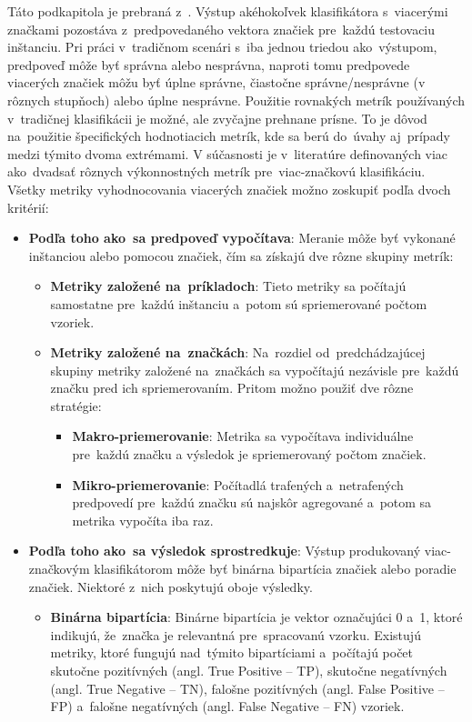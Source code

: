 Táto podkapitola je prebraná z~\cite{Herrera:2016}. Výstup akéhokoľvek klasifikátora s~viacerými značkami pozostáva z~predpovedaného vektora značiek pre~každú testovaciu inštanciu. Pri práci v~tradičnom scenári s~iba jednou triedou ako~výstupom,  predpoveď môže byť správna alebo nesprávna, naproti tomu predpovede viacerých značiek môžu byť úplne správne, čiastočne správne/nesprávne (v rôznych stupňoch) alebo úplne nesprávne.
Použitie rovnakých metrík používaných v~tradičnej klasifikácii je možné, ale zvyčajne prehnane prísne. To je dôvod na~použitie špecifických hodnotiacich metrík, kde sa berú do~úvahy aj~prípady medzi týmito dvoma extrémami.
V súčasnosti je v~literatúre definovaných viac ako~dvadsať rôznych výkonnostných metrík pre~viac-značkovú klasifikáciu. Všetky metriky vyhodnocovania viacerých značiek možno zoskupiť podľa dvoch kritérií:
\begin{itemize}
\item \textbf{Podľa toho ako~sa  predpoveď vypočítava}: Meranie môže byť vykonané inštanciou alebo pomocou
značiek, čím sa získajú dve rôzne skupiny metrík:
    \begin{itemize}
    \item \textbf{Metriky založené na~príkladoch}: Tieto metriky sa počítajú samostatne pre~každú inštanciu a~potom sú  spriemerované počtom vzoriek.
    \item \textbf{Metriky založené na~značkách}: Na~rozdiel od~predchádzajúcej skupiny metriky založené na~značkách sa vypočítajú nezávisle pre~každú značku pred ich spriemerovaním. Pritom možno použiť dve rôzne stratégie:
        \begin{itemize}
        \item \textbf{Makro-priemerovanie}: Metrika sa vypočítava individuálne pre~každú značku a
        výsledok je spriemerovaný počtom značiek.
        \item \textbf{Mikro-priemerovanie}: Počítadlá trafených a~netrafených predpovedí pre~každú značku sú najskôr agregované a~potom sa metrika vypočíta iba raz.
        \end{itemize}
    \end{itemize}
\item \textbf{Podľa toho ako~sa výsledok sprostredkuje}: Výstup produkovaný viac-značkovým klasifikátorom môže byť binárna bipartícia značiek alebo poradie značiek. Niektoré z~nich poskytujú oboje výsledky.
    \begin{itemize}
    \item \textbf{Binárna bipartícia}: Binárne bipartícia je vektor označujúci 0 a~1, ktoré indikujú, že~značka je relevantná pre~spracovanú vzorku. Existujú metriky, ktoré fungujú nad~týmito bipartíciami a~počítajú počet skutočne pozitívných (angl. True Positive -- TP), skutočne negatívných (angl. True Negative -- TN), falošne pozitívných (angl. False Positive -- FP) a~falošne negatívných (angl. False Negative -- FN) vzoriek.

\end{itemize}
\end{itemize}
